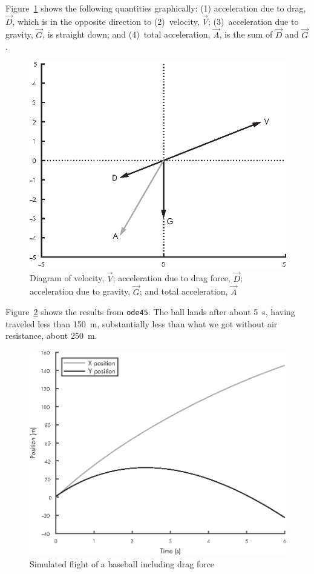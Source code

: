 Figure~\ref{fig:vector3} shows the following quantities graphically:  (1) acceleration due to drag, $\vec{D}$, which is in the opposite direction to (2)~velocity, $\vec{V}$; (3)~acceleration due to gravity, $\vec{G}$, is straight down; and (4)~total acceleration, $\vec{A}$, is the sum of $\vec{D}$ and $\vec{G}$.

\begin{figure}[H]
\includegraphics{book/images/figure12_03_new.eps}
\caption{Diagram of velocity, $\vec{V}$; acceleration due to drag force, 
$\vec{D}$; acceleration due to gravity, $\vec{G}$; and total acceleration, $\vec{A}$}
\label{fig:vector3}
\end{figure}


Figure~\ref{fig:baseball2} shows the results from \lstinline{ode45}.  The ball lands after about \SI{5}{\second}, having traveled less than \SI{150}{\meter}, substantially less than what we got without air resistance, about \SI{250}{\meter}.

\begin{figure}[H]
\includegraphics{book/images/figure12_04_new.eps}
\caption{Simulated flight of a baseball including drag force}
\label{fig:baseball2}
\end{figure}

